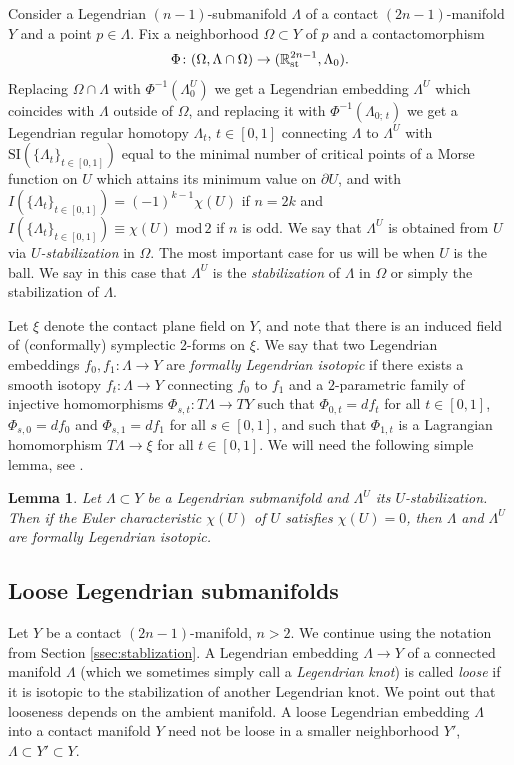\documentclass[reqno,11pt]{amsart}
\numberwithin{equation}{section}
\theoremstyle{my}
\theoremstyle{my}
\newtheorem{Lemma}[thm]{Lemma}
\theoremstyle{your}
\newcommand{\R}{\mathbb{R}}
\newcommand{\SI}{\mathrm{SI}}
\newcommand{\p}{\partial }
\begin{document}
Consider a Legendrian $(n-1)$-submanifold $\Lambda$ of a contact $(2n-1)$-manifold $Y$ and a point $p\in\Lambda$. Fix a neighborhood $\Omega\subset Y$ of $p$ and a contactomorphism 
$$
\Phi\colon(\Omega,\Lambda\cap \Omega)\to (\R^{2n-1}_{\rm st},\Lambda_0).
$$
Replacing $\Omega\cap\Lambda$ with $\Phi^{-1}(\Lambda_0^U)$ we get
a Legendrian embedding $\Lambda^U$ which  coincides with $\Lambda$ outside of $\Omega$, and replacing it with $\Phi^{-1}(\Lambda_{0;\,t})$ we get a Legendrian regular homotopy
$\Lambda_t$, $t\in[0,1]$ connecting $\Lambda$ to $\Lambda^{U}$   
with $\SI\left(\{\Lambda_t\}_{t\in[0,1]}\right)$ equal to the minimal number of critical points of a Morse function on $U$ which attains its minimum value on $\p U$,  and with $I\left(\{\Lambda_t\}_{t\in[0,1]}\right)= (-1)^{k-1}\chi(U)$ if $n=2k$  and $I\left(\{\Lambda_t\}_{t\in[0,1]}\right)\equiv \chi(U)\;\mathrm{mod}\,2$ if $n$ is odd.  
We say that $\Lambda^U$ is obtained from $U$ via \emph{$U$-stabilization} in $\Omega$.
The most important case for us will be when $U$ is the ball. 
We say in this case that $\Lambda^U$ is the \emph{stabilization} of $\Lambda$ in $\Omega$ or simply the stabilization of $\Lambda$. 


Let $\xi$ denote the contact plane field on $Y$, and note that there is an induced field of (conformally) symplectic 2-forms on $\xi$. We say that two Legendrian embeddings $f_0,f_1\colon\Lambda\to Y$ are \emph{formally Legendrian isotopic} if there exists a smooth isotopy $f_t\colon\Lambda\to Y$ connecting $f_0$ to $f_1$ and a $2$-parametric family of injective homomorphisms $\Phi_{s,t}:T\Lambda\to TY$ such that $\Phi_{0,t}=df_t$ for all $t\in[0,1]$, $\Phi_{s,0}=df_0$ and $\Phi_{s,1}=df_1$ for all $s\in[0,1]$, and such that $\Phi_{1,t}$ is a Lagrangian homomorphism $T\Lambda\to\xi$ for all $t\in[0,1]$. We will need the following simple lemma, see \cite{Eliash-Stein,CieEli-Stein,Mur}.

\begin{Lemma}\label{lm:stab-formal}
Let $\Lambda\subset Y$ be a Legendrian submanifold  and $\Lambda^U$ its  $U$-stabilization. Then if the Euler characteristic $\chi(U)$ of $U$ satisfies $\chi(U)=0$, then $\Lambda$ and $\Lambda^U$ are formally Legendrian isotopic.  
\end{Lemma}



\subsection{Loose Legendrian submanifolds}
Let $Y$ be a contact $(2n-1)$-manifold, $n>2$. We continue using the notation from Section \ref{ssec:stablization}. A Legendrian  embedding $\Lambda\to Y$ of a connected manifold $\Lambda$ (which we sometimes simply call a \emph{Legendrian knot}) is called \emph{loose}
if it is isotopic to the stabilization of another Legendrian knot.  
We point out  that looseness depends on the ambient manifold. A loose Legendrian embedding $\Lambda$ into a contact manifold $Y$ need not be loose in a smaller neighborhood $Y'$, $\Lambda\subset Y'\subset Y$. 
\end{document}
